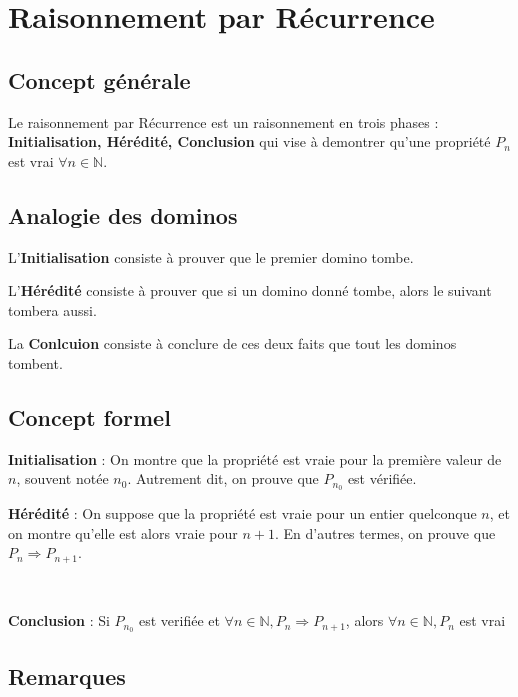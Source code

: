 \documentclass{report}
\begin{document}
    \newpage


    \section{Raisonnement par Récurrence}

    \subsection{Concept générale}

    Le raisonnement par Récurrence est un raisonnement en trois phases : \textbf{Initialisation, Hérédité, Conclusion}
    qui vise à demontrer qu'une propriété $P_n$ est vrai $\forall n \in \mathbb{N}$.

    \subsection{Analogie des dominos}

    L'\textbf{Initialisation} consiste à prouver que le premier domino tombe.

    L'\textbf{Hérédité} consiste à prouver que si un domino donné tombe, alors le suivant tombera aussi.

    La \textbf{Conlcuion} consiste à conclure de ces deux faits que tout les dominos tombent.

    \subsection{Concept formel}


    \textbf{Initialisation} : On montre que la propriété est vraie pour la première valeur de \( n \), souvent notée \( n_0 \). Autrement dit, on prouve que $P_{n_0}$ est vérifiée.

    \textbf{Hérédité} : On suppose que la propriété est vraie pour un entier quelconque \( n \), et on montre qu'elle est alors vraie pour \( n + 1 \). En d'autres termes, on prouve que $P_n \Rightarrow P_{n+1}$.

    ~

    \textbf{Conclusion} : Si $P_{n_0}$ est verifiée et $\forall n \in \mathbb{N}, P_n \Rightarrow P_{n+1}$, alors $\forall n \in \mathbb{N}, P_n$ est vrai 


    \subsection{Remarques}
\end{document}
